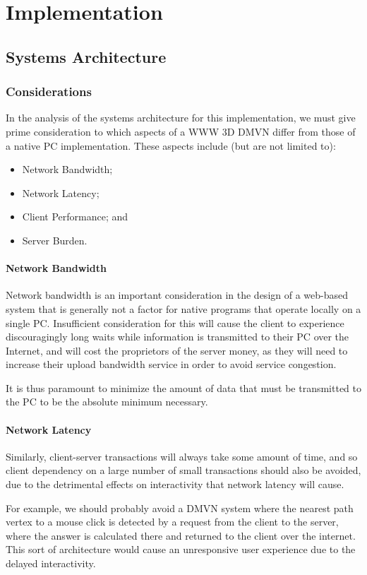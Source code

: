 
\chapter{Implementation}


\section{Systems Architecture}

\subsection {Considerations}
In the analysis of the systems architecture for this implementation, we must give prime consideration to which aspects of a WWW 3D DMVN differ from those of a native PC implementation. These aspects include (but are not limited to):
\begin{itemize}
\item Network Bandwidth;
\item Network Latency;
\item Client Performance; and
\item Server Burden.
\end{itemize}

\subsubsection{Network Bandwidth}
Network bandwidth is an important consideration in the design of a web-based system that is generally not a factor for native programs that operate locally on a single PC. Insufficient consideration for this will cause the client to experience discouragingly long waits while information is transmitted to their PC over the Internet, and will cost the proprietors of the server money, as they will need to increase their upload bandwidth service in order to avoid service congestion.\cite{responsetime}
\par It is thus paramount to minimize the amount of data that must be transmitted to the PC to be the absolute minimum necessary.

\subsubsection{Network Latency}
Similarly, client-server transactions will always take some amount of time, and so client dependency on a large number of small transactions should also be avoided, due to the detrimental effects on interactivity that network latency will cause.
\par For example, we should probably avoid a DMVN system where the nearest path vertex to a mouse click is detected by a request from the client to the server, where the answer is calculated there and returned to the client over the internet. This sort of architecture would cause an unresponsive user experience due to the delayed interactivity.\cite{responsetime}

